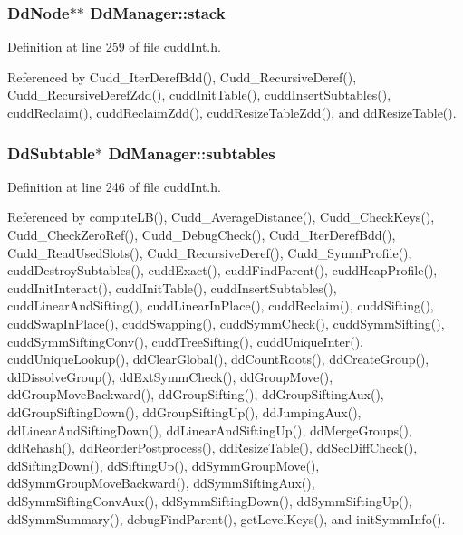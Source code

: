 \subsubsection{\setlength{\rightskip}{0pt plus 5cm}\bf{Dd\-Node}$\ast$$\ast$ \bf{Dd\-Manager::stack}}\label{structDdManager_f99ce33d5dcd3dcf67f10bd7da6a5aa5}




Definition at line 259 of file cudd\-Int.h.

Referenced by Cudd\_\-Iter\-Deref\-Bdd(), Cudd\_\-Recursive\-Deref(), Cudd\_\-Recursive\-Deref\-Zdd(), cudd\-Init\-Table(), cudd\-Insert\-Subtables(), cudd\-Reclaim(), cudd\-Reclaim\-Zdd(), cudd\-Resize\-Table\-Zdd(), and dd\-Resize\-Table().
\subsubsection{\setlength{\rightskip}{0pt plus 5cm}\bf{Dd\-Subtable}$\ast$ \bf{Dd\-Manager::subtables}}\label{structDdManager_835661f21be3f5d8944d76e22995be1f}




Definition at line 246 of file cudd\-Int.h.

Referenced by compute\-LB(), Cudd\_\-Average\-Distance(), Cudd\_\-Check\-Keys(), Cudd\_\-Check\-Zero\-Ref(), Cudd\_\-Debug\-Check(), Cudd\_\-Iter\-Deref\-Bdd(), Cudd\_\-Read\-Used\-Slots(), Cudd\_\-Recursive\-Deref(), Cudd\_\-Symm\-Profile(), cudd\-Destroy\-Subtables(), cudd\-Exact(), cudd\-Find\-Parent(), cudd\-Heap\-Profile(), cudd\-Init\-Interact(), cudd\-Init\-Table(), cudd\-Insert\-Subtables(), cudd\-Linear\-And\-Sifting(), cudd\-Linear\-In\-Place(), cudd\-Reclaim(), cudd\-Sifting(), cudd\-Swap\-In\-Place(), cudd\-Swapping(), cudd\-Symm\-Check(), cudd\-Symm\-Sifting(), cudd\-Symm\-Sifting\-Conv(), cudd\-Tree\-Sifting(), cudd\-Unique\-Inter(), cudd\-Unique\-Lookup(), dd\-Clear\-Global(), dd\-Count\-Roots(), dd\-Create\-Group(), dd\-Dissolve\-Group(), dd\-Ext\-Symm\-Check(), dd\-Group\-Move(), dd\-Group\-Move\-Backward(), dd\-Group\-Sifting(), dd\-Group\-Sifting\-Aux(), dd\-Group\-Sifting\-Down(), dd\-Group\-Sifting\-Up(), dd\-Jumping\-Aux(), dd\-Linear\-And\-Sifting\-Down(), dd\-Linear\-And\-Sifting\-Up(), dd\-Merge\-Groups(), dd\-Rehash(), dd\-Reorder\-Postprocess(), dd\-Resize\-Table(), dd\-Sec\-Diff\-Check(), dd\-Sifting\-Down(), dd\-Sifting\-Up(), dd\-Symm\-Group\-Move(), dd\-Symm\-Group\-Move\-Backward(), dd\-Symm\-Sifting\-Aux(), dd\-Symm\-Sifting\-Conv\-Aux(), dd\-Symm\-Sifting\-Down(), dd\-Symm\-Sifting\-Up(), dd\-Symm\-Summary(), debug\-Find\-Parent(), get\-Level\-Keys(), and init\-Symm\-Info().
